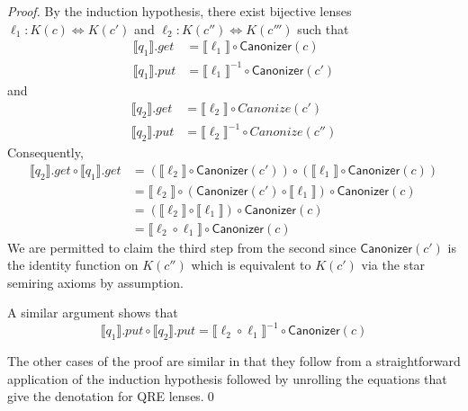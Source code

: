 \documentclass{svproc}
\newcommand{\kw}[1]{\ensuremath{\mathsf{#1}}}
\newcommand{\canonizer}{\ensuremath{\kw{Canonizer}}}
\begin{document}
\begin{proof}
  By the induction hypothesis, there exist bijective lenses
  $\ell_1 :
  K(c) \Leftrightarrow K(c')$ and $\ell_2 : K(c'') \Leftrightarrow K(c''')$ such
  that
  \begin{align*}
\llbracket q_1 \rrbracket.get &= \llbracket \ell_1 \rrbracket \circ
\canonizer(c)\\
\llbracket q_1 \rrbracket.put &= {\llbracket \ell_1 \rrbracket}^{-1} \circ
\canonizer(c')
\end{align*}
and
\begin{align*}
\llbracket q_2 \rrbracket.get &= \llbracket \ell_2 \rrbracket \circ
Canonize(c')\\
\llbracket q_2 \rrbracket.put &= {\llbracket \ell_2 \rrbracket}^{-1} \circ
Canonize(c'')
\end{align*}
Consequently,
\begin{align*}
\llbracket q_2 \rrbracket.get \circ \llbracket q_1 \rrbracket.get &=
(\llbracket \ell_2 \rrbracket \circ \canonizer(c')) \circ (\llbracket \ell_1
\rrbracket \circ \canonizer(c))\\
&= \llbracket \ell_2 \rrbracket \circ (\canonizer(c') \circ \llbracket \ell_1
\rrbracket) \circ \canonizer(c)\\
&= (\llbracket \ell_2 \rrbracket \circ \llbracket \ell_1 \rrbracket) \circ
\canonizer(c)\\
&= \llbracket \ell_2  \circ  \ell_1 \rrbracket \circ
\canonizer(c)
\end{align*} 
We are permitted to claim the third step from the second since
$\canonizer(c')$ is the identity function on $K(c'')$ which is
equivalent to $K(c')$ via the star semiring axioms by assumption.

A similar argument shows that 
$$\llbracket q_1 \rrbracket.put \circ \llbracket q_2 \rrbracket.put =
\llbracket \ell_2  \circ  \ell_1 \rrbracket^{-1} \circ
\canonizer(c)$$

The other cases of the proof are similar in that they follow from a
straightforward application of the induction hypothesis followed by unrolling
the equations that give the denotation for QRE lenses.\qed
\end{proof}
\iffalse
\end{document}
